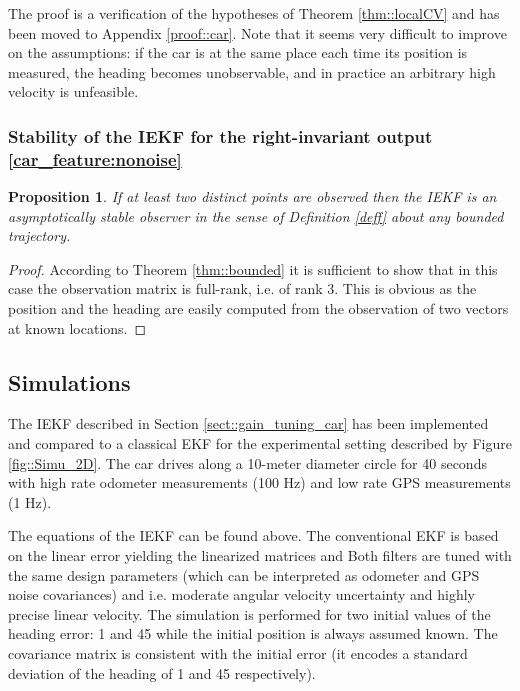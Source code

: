 \documentclass[a4paper,12pt,onecolumn]{article}
\newtheorem{prop}{Proposition}
\begin{document}
The proof is a verification of the hypotheses of Theorem \ref{thm::localCV} and  has been moved to Appendix \ref{proof::car}.  
Note that it seems very difficult to improve on the assumptions: if the car is at the same place each time its position is measured, the heading  becomes unobservable, and in practice an arbitrary high velocity is unfeasible. 
 \subsubsection{Stability of the IEKF for the right-invariant output \eqref{car_feature:nonoise}}




\begin{prop}
If at least two distinct points are observed then the IEKF is an asymptotically stable observer in the sense of Definition \ref{deff} about \emph{any} bounded trajectory.
\end{prop}

\begin{proof}
According to Theorem \ref{thm::bounded} it is sufficient to show that in this case the observation matrix  is full-rank, i.e. of rank 3. This is obvious as the position and the heading are easily computed from the observation of two vectors at known locations.
\end{proof}

\subsection{Simulations}

The IEKF described in Section \ref{sect::gain_tuning_car} has been implemented and compared to a classical EKF for the experimental setting described by Figure \ref{fig::Simu_2D}. The car drives along a 10-meter diameter circle  for 40 seconds with high rate odometer measurements (100 Hz) and low rate GPS measurements (1 Hz). 

The equations of the IEKF can be found above. The conventional  EKF  is based on the linear error  yielding the linearized matrices   and 
 Both filters are tuned with the same design parameters (which can be interpreted as odometer and GPS noise covariances)  and  i.e. moderate angular velocity uncertainty and highly precise linear velocity. 
The simulation is performed for two initial values of the heading error: 1 and 45 while the initial position is always assumed known. The covariance matrix  is consistent with the initial error (it encodes a standard deviation of the heading of 1 and 45 respectively).
\end{document}

